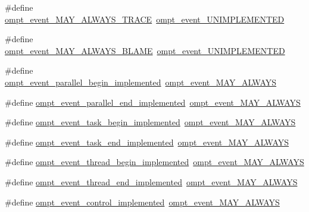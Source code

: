 \begin{DoxyCompactItemize}
\item 
\#define \hyperlink{ompt-event-specific_8h_a81d63d53ff090774864cdd033effe56e}{ompt\-\_\-event\-\_\-\-M\-A\-Y\-\_\-\-A\-L\-W\-A\-Y\-S\-\_\-\-T\-R\-A\-C\-E}~\hyperlink{ompt-event-specific_8h_a5719430a79b410eee8d68fcec0fbf8f2}{ompt\-\_\-event\-\_\-\-U\-N\-I\-M\-P\-L\-E\-M\-E\-N\-T\-E\-D}
\item 
\#define \hyperlink{ompt-event-specific_8h_a7014420b707fad74a0e4a1f14d46067d}{ompt\-\_\-event\-\_\-\-M\-A\-Y\-\_\-\-A\-L\-W\-A\-Y\-S\-\_\-\-B\-L\-A\-M\-E}~\hyperlink{ompt-event-specific_8h_a5719430a79b410eee8d68fcec0fbf8f2}{ompt\-\_\-event\-\_\-\-U\-N\-I\-M\-P\-L\-E\-M\-E\-N\-T\-E\-D}
\item 
\#define \hyperlink{ompt-event-specific_8h_a4abd674123d98567d555df272dd21488}{ompt\-\_\-event\-\_\-parallel\-\_\-begin\-\_\-implemented}~\hyperlink{ompt-event-specific_8h_a4d43508adffb6fe8f9fe8a520b8142f4}{ompt\-\_\-event\-\_\-\-M\-A\-Y\-\_\-\-A\-L\-W\-A\-Y\-S}
\item 
\#define \hyperlink{ompt-event-specific_8h_ad0eca7eec9a34b5851b319d0b5f2617b}{ompt\-\_\-event\-\_\-parallel\-\_\-end\-\_\-implemented}~\hyperlink{ompt-event-specific_8h_a4d43508adffb6fe8f9fe8a520b8142f4}{ompt\-\_\-event\-\_\-\-M\-A\-Y\-\_\-\-A\-L\-W\-A\-Y\-S}
\item 
\#define \hyperlink{ompt-event-specific_8h_a448fa1348f93610b50e4c3d7d253ff58}{ompt\-\_\-event\-\_\-task\-\_\-begin\-\_\-implemented}~\hyperlink{ompt-event-specific_8h_a4d43508adffb6fe8f9fe8a520b8142f4}{ompt\-\_\-event\-\_\-\-M\-A\-Y\-\_\-\-A\-L\-W\-A\-Y\-S}
\item 
\#define \hyperlink{ompt-event-specific_8h_a9af6c1df8ff45eb91a4498f9ef71bb6a}{ompt\-\_\-event\-\_\-task\-\_\-end\-\_\-implemented}~\hyperlink{ompt-event-specific_8h_a4d43508adffb6fe8f9fe8a520b8142f4}{ompt\-\_\-event\-\_\-\-M\-A\-Y\-\_\-\-A\-L\-W\-A\-Y\-S}
\item 
\#define \hyperlink{ompt-event-specific_8h_a722209782b01dfedd5a5ca290535d002}{ompt\-\_\-event\-\_\-thread\-\_\-begin\-\_\-implemented}~\hyperlink{ompt-event-specific_8h_a4d43508adffb6fe8f9fe8a520b8142f4}{ompt\-\_\-event\-\_\-\-M\-A\-Y\-\_\-\-A\-L\-W\-A\-Y\-S}
\item 
\#define \hyperlink{ompt-event-specific_8h_aca5e53faa4517642fdf2a14214acf5a9}{ompt\-\_\-event\-\_\-thread\-\_\-end\-\_\-implemented}~\hyperlink{ompt-event-specific_8h_a4d43508adffb6fe8f9fe8a520b8142f4}{ompt\-\_\-event\-\_\-\-M\-A\-Y\-\_\-\-A\-L\-W\-A\-Y\-S}
\item 
\#define \hyperlink{ompt-event-specific_8h_aacb64e7e982664eb79211c4df9ff3ac2}{ompt\-\_\-event\-\_\-control\-\_\-implemented}~\hyperlink{ompt-event-specific_8h_a4d43508adffb6fe8f9fe8a520b8142f4}{ompt\-\_\-event\-\_\-\-M\-A\-Y\-\_\-\-A\-L\-W\-A\-Y\-S}

\end{DoxyCompactItemize}

